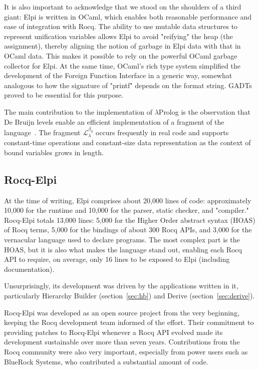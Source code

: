 \documentclass[a4paper, 11pt]{book}
\begin{document}
It is also important to acknowledge that we stood on the shoulders of a third giant: Elpi is written in OCaml, which enables both reasonable performance and ease of integration with Rocq. The ability to use mutable data structures to represent unification variables allows Elpi to avoid "reifying" the heap (the assignment), thereby aligning the notion of garbage in Elpi data with that in OCaml data. This makes it possible to rely on the powerful OCaml garbage collector for Elpi. At the same time, OCaml's rich type system simplified the development of the Foreign Function Interface in a generic way, somewhat analogous to how the signature of "printf" depends on the format string. GADTs proved to be essential for this purpose.

The main contribution to the implementation of $\lambda$Prolog is the observation that De Bruijn levels enable an efficient implementation of a fragment of the language~\cite{dunchev15lpar}. The fragment $\mathcal{L}_\lambda^{\beta_0}$ occurs frequently in real code and supports constant-time operations and constant-size data representation as the context of bound variables grows in length.

\subsection{Rocq-Elpi}


At the time of writing, Elpi comprises about 20,000 lines of code: approximately 10,000 for the runtime and 10,000 for the parser, static checker, and "compiler." Rocq-Elpi totals 13,000 lines: 5,000 for the Higher Order abstract syntax (HOAS) of Rocq terms, 5,000 for the bindings of about 300 Rocq APIs, and 3,000 for the vernacular language used to declare programs. The most complex part is the HOAS, but it is also what makes the language stand out, enabling each Rocq API to require, on average, only 16 lines to be exposed to Elpi (including documentation).

Unsurprisingly, its development was driven by the applications written in it, particularly Hierarchy Builder (section~\ref{sec:hb}) and Derive (section~\ref{sec:derive}).

Rocq-Elpi was developed as an open source project from the very beginning, keeping the Rocq development team informed of the effort. Their commitment to providing patches to Rocq-Elpi whenever a Rocq API evolved made its development sustainable over more than seven years. Contributions from the Rocq community were also very important, especially from power users such as BlueRock Systems, who contributed a substantial amount of code.
\end{document}
